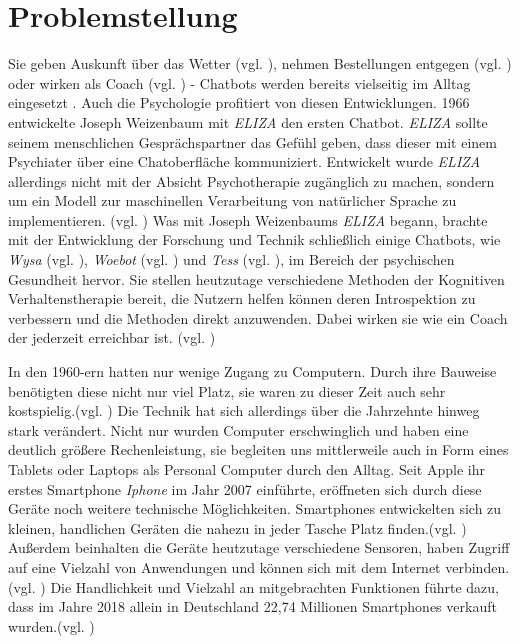 
\section{Problemstellung}
\label{ch:Problemstellung}


Sie geben Auskunft über das Wetter (vgl. \cite{GoogleAl38:online}), nehmen Bestellungen entgegen (vgl. \cite{KassenSc50:online}) oder wirken als Coach (vgl. \cite{Wysayour57:online}) - Chatbots werden bereits vielseitig im Alltag eingesetzt . Auch die Psychologie profitiert von diesen Entwicklungen. 1966 entwickelte Joseph Weizenbaum mit \emph{ELIZA} den ersten Chatbot. \emph{ELIZA} sollte seinem menschlichen Gesprächspartner das Gefühl geben, dass dieser mit einem Psychiater über eine Chatoberfläche kommuniziert. Entwickelt wurde \emph{ELIZA} allerdings nicht mit der Absicht  Psychotherapie zugänglich zu machen, sondern um ein Modell zur maschinellen Verarbeitung von natürlicher Sprache zu implementieren. (vgl. \cite{Weizenbaum1966}) Was mit Joseph Weizenbaums \emph{ELIZA} begann, brachte mit der Entwicklung der Forschung und Technik schließlich einige Chatbots, wie \emph{Wysa} (vgl. \cite{Wysayour57:online}), \emph{Woebot} (vgl. \cite{WoebotYo93:online}) und \emph{Tess} (vgl. \cite{TessArti99:online}), im Bereich der psychischen Gesundheit hervor. Sie stellen heutzutage verschiedene Methoden der Kognitiven Verhaltenstherapie bereit, die Nutzern helfen können deren Introspektion zu verbessern und die Methoden direkt anzuwenden. Dabei wirken sie wie ein Coach der jederzeit erreichbar ist. (vgl. \cite{Fitzpatrick2017}) 

In den 1960-ern hatten nur wenige Zugang zu Computern. Durch ihre Bauweise benötigten diese nicht nur viel Platz, sie waren zu dieser Zeit auch sehr kostspielig.(vgl. \cite{SWB-11524946X}) Die Technik hat sich allerdings über die Jahrzehnte hinweg stark verändert. Nicht nur wurden Computer erschwinglich und haben eine deutlich größere Rechenleistung, sie begleiten uns mittlerweile auch in Form eines Tablets oder Laptops als Personal Computer durch den Alltag. Seit Apple ihr erstes Smartphone \emph{Iphone} im Jahr 2007 einführte, eröffneten sich durch diese Geräte noch weitere technische Möglichkeiten. Smartphones entwickelten sich zu kleinen, handlichen Geräten die nahezu in jeder Tasche Platz finden.(vgl. \cite{SWB-481290869}) Außerdem beinhalten die Geräte heutzutage verschiedene Sensoren, haben Zugriff auf eine Vielzahl von Anwendungen und können sich mit dem Internet verbinden.(vgl. \cite{SWB-481290869}\cite{AppStore21:online}\cite{AndroidA10:online}) Die Handlichkeit und Vielzahl an mitgebrachten Funktionen führte dazu, dass im Jahre 2018 allein in Deutschland 22,74 Millionen Smartphones verkauft wurden.(vgl. \cite{Zukunftd37:online}) 

